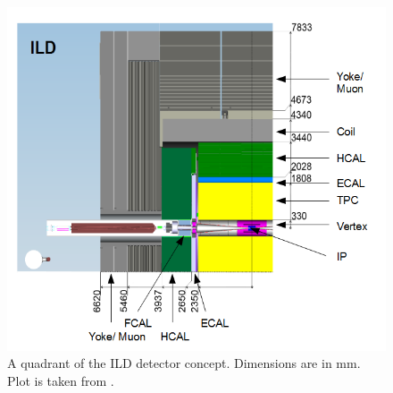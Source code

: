 \documentclass[a4paper,11pt]{article}
\begin{document}
\begin{figure}[htbp]
\centering %

\includegraphics[width=.45\textwidth]{plots/ILD2}
\qquad

\caption{\label{fig:ILD} A quadrant of the ILD detector concept. Dimensions are in mm. Plot is taken from \cite{Brau:2007zza}.
}
\end{figure}








\end{document}
